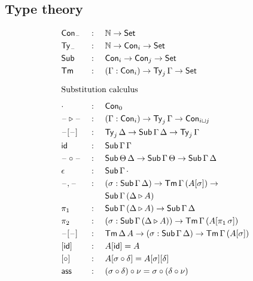 \documentclass{article}
\begin{document}
\thispagestyle{empty}


\begin{multicols}{3}
  \noindent
  \section*{Type theory}
  \begin{alignat*}{5}
  & \Con_{\blank} && :\,\, && \N\ra\Set \\
  & \Ty_{\blank}  && : && \N\ra\Con_i\ra\Set \\
  & \Tms && : && \Con_i\ra\Con_j\ra\Set \\
  & \Tm  && : && (\Gamma:\Con_i)\ra\Ty_j\,\Gamma\ra\Set \\
  & \heading{Substitution calculus} \\
  & \cdot && : && \Con_0 \\
  & \blank\ext\blank && : && (\Gamma:\Con_i)\ra\Ty_j\,\Gamma\ra\Con_{\max{i}{j}} \\
  & \blank[\blank] && : && \Ty_j\,\Delta\ra\Tms\,\Gamma\,\Delta\ra\Ty_j\,\Gamma \\
  & \id && : && \Tms\,\Gamma\,\Gamma \\
  & \blank\circ\blank && : && \Tms\,\Theta\,\Delta\ra\Tms\,\Gamma\,\Theta\ra\Tms\,\Gamma\,\Delta \\
  & \epsilon && : && \Tms\,\Gamma\,\cdot \\
  & \blank,\blank && : && (\sigma:\Tms\,\Gamma\,\Delta)\ra\Tm\,\Gamma\,(A[\sigma])\ra \\
  & && && \Tms\,\Gamma\,(\Delta\ext A) \\
  & \pi_1 && : && \Tms\,\Gamma\,(\Delta\ext A) \ra \Tms\,\Gamma\,\Delta \\
  & \pi_2 && : && (\sigma:\Tms\,\Gamma\,(\Delta\ext A))\ra\Tm\,\Gamma\,(A[\pi_1\,\sigma]) \\
  & \blank[\blank] && : && \Tm\,\Delta\,A\ra(\sigma:\Tms\,\Gamma\,\Delta)\ra\Tm\,\Gamma\,(A[\sigma]) \\
  & [\id] && : && A[\id] = A \\
  & [\circ] && : && A[\sigma \circ \delta] = A[\sigma][\delta] \\
  & \ass && : && (\sigma \circ \delta) \circ \nu = \sigma \circ (\delta \circ \nu) \\

\end{alignat*}
\end{multicols}
\end{document}
